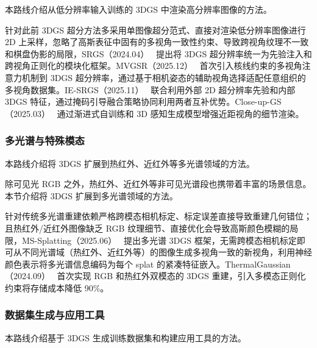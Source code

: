 本路线介绍从低分辨率输入训练的 3DGS 中渲染高分辨率图像的方法。

针对此前 3DGS 超分方法多采用单图像超分范式、直接对渲染低分辨率图像进行 2D 上采样，忽略了高斯表征中固有的多视角一致性约束、导致跨视角纹理不一致和棋盘伪影的局限，SRGS（2024.04）~\cite{2404_10318} 提出将 3DGS 超分辨率统一为先验注入和跨视角正则化的模块化框架。MVGSR（2025.12）~\cite{2512_15048} 首次引入核线约束的多视角注意力机制到 3DGS 超分辨率，通过基于相机姿态的辅助视角选择适配任意组织的多视角数据集。IE-SRGS（2025.11）~\cite{2511_22233} 联合利用外部 2D 超分辨率先验和内部 3DGS 特征，通过掩码引导融合策略协同利用两者互补优势。Close-up-GS（2025.03）~\cite{2503_09396} 通过渐进式自训练和 3D 感知生成模型增强近距视角的细节渲染。

\subsubsection{多光谱与特殊模态}

本路线介绍将 3DGS 扩展到热红外、近红外等多光谱领域的方法。

除可见光 RGB 之外，热红外、近红外等非可见光谱段也携带着丰富的场景信息。本节介绍将 3DGS 扩展到多光谱领域的方法。

针对传统多光谱重建依赖严格跨模态相机标定、标定误差直接导致重建几何错位；且热红外/近红外图像缺乏 RGB 纹理细节、直接优化会导致高斯颜色模糊的局限，MS-Splatting（2025.06）~\cite{2506_03407} 提出多光谱 3DGS 框架，无需跨模态相机标定即可从不同光谱域（热红外、近红外等）的图像生成多视角一致的新视角，利用神经颜色表示将多光谱信息编码为每个 splat 的紧凑特征嵌入。ThermalGaussian（2024.09）~\cite{2409_07200} 首次实现 RGB 和热红外双模态的 3DGS 重建，引入多模态正则化约束将存储成本降低 90\%。

\subsubsection{数据集生成与应用工具}

本路线介绍基于 3DGS 生成训练数据集和构建应用工具的方法。

